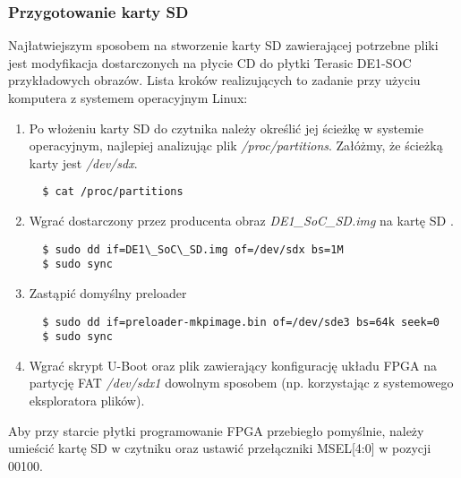 \subsubsection{Przygotowanie karty SD}
Najłatwiejszym sposobem na stworzenie karty SD zawierającej potrzebne pliki jest modyfikacja dostarczonych na płycie CD do płytki Terasic DE1-SOC przykładowych obrazów. Lista kroków realizujących to zadanie przy użyciu komputera z systemem operacyjnym Linux:
\begin{enumerate}
\item Po włożeniu karty SD do czytnika należy określić jej ścieżkę w systemie operacyjnym, najlepiej analizując plik \textit{/proc/partitions}. Załóżmy, że ścieżką karty jest \textit{/dev/sdx}.
\begin{lstlisting}
  $ cat /proc/partitions
\end{lstlisting}

\item Wgrać dostarczony przez producenta obraz \textit{DE1\_SoC\_SD.img} na kartę SD \cite{rocketboards-booting-prebuild}.
\begin{lstlisting}
  $ sudo dd if=DE1\_SoC\_SD.img of=/dev/sdx bs=1M
  $ sudo sync
\end{lstlisting}

\item Zastąpić domyślny preloader
\begin{lstlisting}
  $ sudo dd if=preloader-mkpimage.bin of=/dev/sde3 bs=64k seek=0
  $ sudo sync
\end{lstlisting}

\item Wgrać skrypt U-Boot oraz plik zawierający konfigurację układu FPGA na partycję FAT \textit{/dev/sdx1} dowolnym sposobem (np. korzystając z systemowego eksploratora plików).
\end{enumerate}

Aby przy starcie płytki programowanie FPGA przebiegło pomyślnie, należy umieścić kartę SD w czytniku oraz ustawić przełączniki MSEL[4:0] w pozycji 00100.

